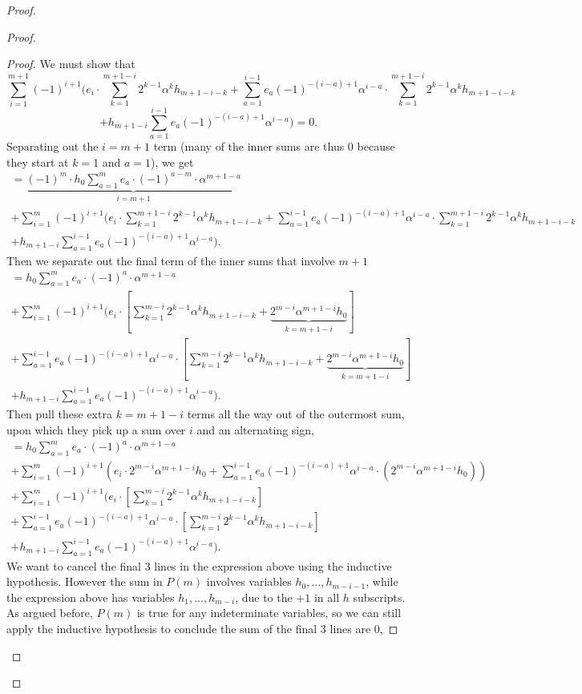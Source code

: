 \documentclass[11pt]{article}
\theoremstyle{plain}
\theoremstyle{definition}
\theoremstyle{definition}
\begin{document}
\begin{proof}
\begin{proof}
\begin{proof}
We must show that 
$$
\sum_{i=1}^{m+1}(-1)^{i+1}\Bigg(e_i \cdot \sum_{k=1}^{m+1-i}2^{k-1}\alpha^kh_{m+1-i-k} + \sum_{a=1}^{i-1}e_a (-1)^{-(i-a)+1}\alpha^{i-a}\cdot \sum_{k=1}^{m+1-i}2^{k-1}\alpha^kh_{m+1-i-k}
$$
$$
+h_{m+1-i}\sum_{a=1}^{i-1}e_a(-1)^{-(i-a)+1}\alpha^{i-a}\Bigg)=0.
$$
Separating out the $i=m+1$ term (many of the inner sums are thus 0 because they start at $k=1$ and $a=1$), we get
\begin{gather*}
=\underbrace{(-1)^m\cdot h_0 \sum_{a=1}^me_a\cdot(-1)^{a-m}\cdot \alpha^{m+1-a}}_{i=m+1}\\
+\sum_{i=1}^{m}(-1)^{i+1}\Bigg(e_i \cdot \sum_{k=1}^{m+1-i}2^{k-1}\alpha^kh_{m+1-i-k} + \sum_{a=1}^{i-1}e_a (-1)^{-(i-a)+1}\alpha^{i-a}\cdot \sum_{k=1}^{m+1-i}2^{k-1}\alpha^kh_{m+1-i-k}\\
+h_{m+1-i}\sum_{a=1}^{i-1}e_a(-1)^{-(i-a)+1}\alpha^{i-a}\Bigg).
\end{gather*}
Then we separate out the final term of the inner sums that involve $m+1$
\begin{gather*}
= h_0 \sum_{a=1}^me_a\cdot(-1)^a\cdot \alpha^{m+1-a}\\
+\sum_{i=1}^{m}(-1)^{i+1}\Bigg(e_i \cdot \left[\sum_{k=1}^{m-i}2^{k-1}\alpha^kh_{m+1-i-k} +\underbrace{2^{m-i}\alpha^{m+1-i}h_0}_{k=m+1-i}\right]\\
+ \sum_{a=1}^{i-1}e_a (-1)^{-(i-a)+1}\alpha^{i-a}\cdot \left[\sum_{k=1}^{m-i}2^{k-1}\alpha^kh_{m+1-i-k}+\underbrace{2^{m-i}\alpha^{m+1-i}h_0}_{k=m+1-i}\right]\\
+h_{m+1-i}\sum_{a=1}^{i-1}e_a(-1)^{-(i-a)+1}\alpha^{i-a}\Bigg).
\end{gather*}
Then pull these extra $k=m+1-i$ terms all the way out of the outermost sum, upon which they pick up a sum over $i$ and an alternating sign,
\begin{gather*}
=h_0\sum_{a=1}^me_a\cdot(-1)^a\cdot \alpha^{m+1-a}\\
+\sum_{i=1}^m(-1)^{i+1}\left(e_i\cdot 2^{m-i}\alpha^{m+1-i}h_0 + \sum_{a=1}^{i-1}e_a(-1)^{-(i-a)+1}\alpha^{i-a}\cdot(2^{m-i}\alpha^{m+1-i}h_0)\right)\\
+\sum_{i=1}^{m}(-1)^{i+1}\Bigg(e_i \cdot \left[\sum_{k=1}^{m-i}2^{k-1}\alpha^kh_{m+1-i-k}\right]\\
+ \sum_{a=1}^{i-1}e_a (-1)^{-(i-a)+1}\alpha^{i-a}\cdot \left[\sum_{k=1}^{m-i}2^{k-1}\alpha^kh_{m+1-i-k}\right]\\
+h_{m+1-i}\sum_{a=1}^{i-1}e_a(-1)^{-(i-a)+1}\alpha^{i-a}\Bigg).
\end{gather*}
We want to cancel the final 3 lines in the expression above using the inductive hypothesis. However the sum in $P(m)$ involves variables $h_0,\dots,h_{m-i-1}$, while the expression above has variables $h_1,\dots,h_{m-i}$, due to the $+1$ in all $h$ subscripts. As argued before, $P(m)$ is true for any indeterminate variables, so we can still apply the inductive hypothesis to conclude the sum of the final 3 lines are 0,

\end{proof}
\end{proof}
\end{proof}
\end{document}
